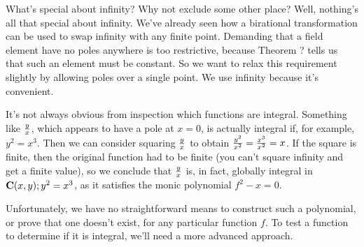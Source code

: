 What's special about infinity?  Why not exclude some other place?
Well, nothing's all that special about infinity.  We've already seen
how a birational transformation can be used to swap infinity with any
finite point.  Demanding that a field element have no poles anywhere
is too restrictive, because Theorem ? tells us that such an element
must be constant.  So we want to relax this requirement slightly by
allowing poles over a single point.  We use infinity because it's
convenient.

It's not always obvious from inspection which functions are integral.
Something like $y \over x$, which appears to have a pole at $x=0$, is
actually integral if, for example, $y^2=x^3$.  Then we can consider
squaring $y \over x$ to obtain ${y^2 \over x^2} = {x^3 \over x^2} =
x$.  If the square is finite, then the original function had to be
finite (you can't square infinity and get a finite value), so we
conclude that $y \over x$ is, in fact, globally integral in ${\bf
C}(x,y); y^2=x^3$, as it satisfies the monic polynomial $f^2 - x = 0$.

Unfortunately, we have no straightforward means to construct such a
polynomial, or prove that one doesn't exist, for any particular
function $f$.  To test a function to determine if it is integral,
we'll need a more advanced approach.

